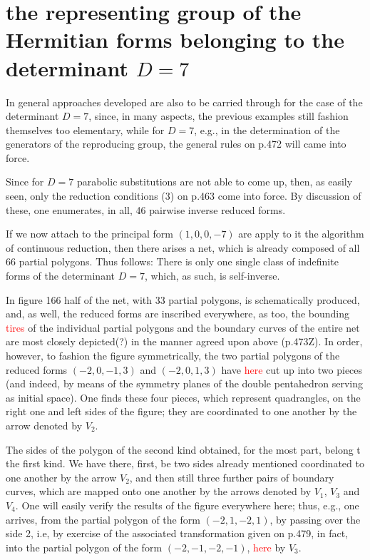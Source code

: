 \section{the representing group of the Hermitian forms belonging to the determinant $D=7$}

In general approaches developed are also to be carried through for the case of the determinant $D=7$, since, in many aspects, the previous examples still fashion themselves too elementary, while for $D=7$, e.g., in the determination of the generators of the reproducing group, the general rules on p.472 will came into force.

Since for $D=7$ parabolic substitutions are not able to come up, then, as easily seen, only the reduction conditions (3) on p.463 come into force. By discussion of these, one enumerates, in all, 46 pairwise inverse reduced forms.
 
If we now attach to the principal form $(1, 0, 0, -7)$ are apply to it the algorithm of continuous reduction, then there arises a net, which is already composed of all 66 partial polygons. Thus follows: There is only one single class of indefinite forms of the determinant $D=7$, which, as such, is self-inverse.

In figure 166 half of the net, with 33 partial polygons, is schematically produced, and, as well, the reduced forms are inscribed everywhere, as too, the bounding \textcolor{red}{tires} of the individual partial polygons and the boundary curves of the entire net are most closely depicted(?) in the manner agreed upon above (p.473Z). In order, however, to fashion the figure symmetrically, the two partial polygons of the reduced forms $(-2,0,-1,3)$ and $(-2,0,1,3)$ have \textcolor{red}{here} cut up into two pieces (and indeed, by means of the symmetry planes of the double pentahedron serving as initial space). One finds these four pieces, which represent quadrangles, on the right one and left sides of the figure; they are coordinated to one another by the arrow denoted by $V_2$.

The sides of the polygon of the second kind obtained, for the most part, belong t the first kind. We have there, first, be two sides already mentioned coordinated to one another by the arrow $V_2$, and then still three further pairs of boundary curves, which are mapped onto one another by the arrows denoted by $V_1$, $V_3$ and $V_4$. One will easily verify the results of the figure everywhere here; thus, e.g., one arrives, from the partial polygon of the form $(-2,1,-2,1)$, by passing over the side 2, i.e, by exercise of the associated transformation given on p.479, in fact, into the partial polygon of the form $(-2,-1,-2,-1)$, \textcolor{red}{here} by $V_3$.


